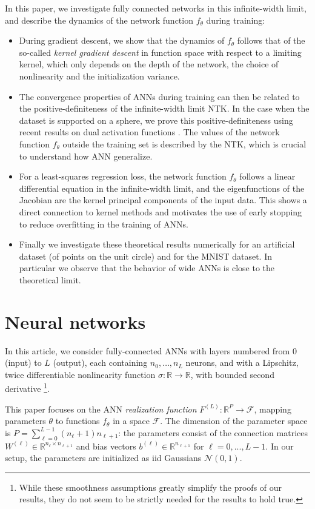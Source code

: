 \documentclass{article}
\begin{document}
In this paper, we investigate fully connected networks in this infinite-width limit, and describe the dynamics of the network function $f_\theta$ during training:
\begin{itemize}
\item
During gradient descent, we show that the dynamics of $f_\theta$ follows that of the so-called \emph{kernel gradient descent} in function space with respect to a limiting kernel, which only depends on the depth of the network, the choice of nonlinearity and the initialization variance.
\item
The convergence properties of ANNs during training can then be related to the positive-definiteness of the infinite-width limit NTK. In the case when the dataset is supported on a sphere, we prove this positive-definiteness using recent results on dual activation functions \cite{Daniely}. The values of the network function $f_\theta$ outside the training set is described by the NTK, which is crucial to understand how ANN generalize.
\item
For a least-squares regression loss, the network function $f_{\theta}$ follows a linear differential equation in the infinite-width limit, and the eigenfunctions of the Jacobian are the kernel principal components of the input data. This shows a direct connection to kernel methods and motivates the use of early stopping to reduce overfitting in the training of ANNs.
\item
Finally we investigate these theoretical results numerically for an artificial dataset (of points on the unit circle) and for the MNIST dataset. In particular we observe that the behavior of wide ANNs is close to the theoretical limit.
\end{itemize}

\section{Neural networks}\label{sec:realization_function}
In this article, we consider fully-connected ANNs with layers numbered from $0$ (input) to $L$ (output), each containing $n_{0},\ldots,n_{L}$ neurons, and with a Lipschitz, twice differentiable nonlinearity function $\sigma:\mathbb{R}\to\mathbb{R}$, with bounded second derivative \footnote{While these smoothness assumptions greatly simplify the proofs of our results, they do not seem to be strictly needed for the results to hold true.}.

This paper focuses on the ANN \emph{realization function} $F^{(L)} : \mathbb{R}^{P} \to \mathcal{F}$, mapping parameters $\theta$ to functions $f_\theta$ in a space $\mathcal{F}$. The dimension of the parameter space is $P = \sum_{\ell=0}^{L-1} (n_\ell + 1) n_{\ell+1}$: the parameters consist of the connection matrices $W^{(\ell)} \in \mathbb{R}^{n_\ell \times n_{\ell+1}}$ and bias vectors $b^{(\ell)} \in \mathbb{R}^{n_{\ell+1}}$ for $\ell=0, ..., L-1$.  In our setup, the parameters are initialized as iid Gaussians $\mathcal{N}(0, 1)$.
\end{document}
